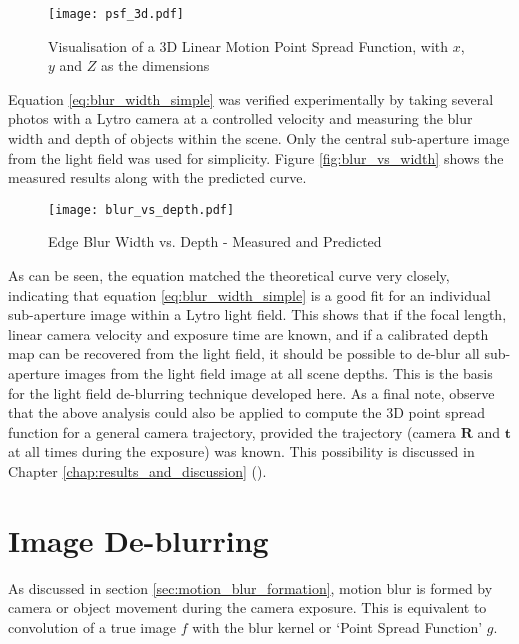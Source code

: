 \begin{figure}[h]
\centering
\texttt{[image: psf\_3d.pdf]}
\caption[Visualisation of a 3D Point Spread Function]{Visualisation of a 3D Linear Motion Point Spread Function, with $x$, $y$ and $Z$ as the dimensions}
\label{fig:psf_3d}
\end{figure}

Equation \ref{eq:blur_width_simple} was verified experimentally by taking several photos with a Lytro camera at a controlled velocity and measuring the blur width and depth of objects within the scene.
Only the central sub-aperture image from the light field was used for simplicity.
Figure \ref{fig:blur_vs_width} shows the measured results along with the predicted curve.

\begin{figure}[h]
\centering
\caption[Edge Blur Width vs. Depth]{Edge Blur Width vs. Depth - Measured and Predicted}
\label{fig:blur_vs_depth}
\texttt{[image: blur\_vs\_depth.pdf]}
\end{figure}

As can be seen, the equation matched the theoretical curve very closely, indicating that equation \ref{eq:blur_width_simple} is a good fit for an individual sub-aperture image within a Lytro light field.
This shows that if the focal length, linear camera velocity and exposure time are known, and if a calibrated depth map can be recovered from the light field, it should be possible to de-blur all sub-aperture images from the light field image at all scene depths.
This is the basis for the light field de-blurring technique developed here.
As a final note, observe that the above analysis could also be applied to compute the 3D point spread function for a general camera trajectory, provided the trajectory (camera $\boldsymbol{R}$ and $\boldsymbol{t}$ at all times during the exposure) was known.
This possibility is discussed in Chapter \ref{chap:results_and_discussion} ().


\section{Image De-blurring}
\label{sec:image_deblurring}

As discussed in section \ref{sec:motion_blur_formation}, motion blur is formed by camera or object movement during the camera exposure.
This is equivalent to convolution of a true image $f$ with the blur kernel or \enquote*{Point Spread Function} $g$.


